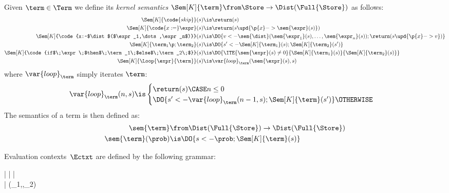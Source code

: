 \begin{definition}
\label{def:semantics}
  Given $\term \in \Term$ we define its \emph{kernel semantics}
  $\Sem[K]{\term} \from \Store \to \Dist(\Full{\Store}) $
  as follows:
  \begin{align*}
    \Sem[K]{\code{skip}}(s) &\is
      \return(s)
    \\
    \Sem[K]{\code{x:=}\expr}(s) &\is
        \return(s\upd{\p{x}->\sem{\expr}(s)})
    \\
    \Sem[K]{\code{x:~$\dist$($\expr_1,\dots,\expr_n$)}}(s) &\is
      \DO{
        v <- \sem{\dist}(\sem{\expr_1}(s),\dots,\sem{\expr_n}(s));
        \return(s\upd{\p{x}->v})
      }
    \\
    \Sem[K]{\term_1\p;\term_2}(s) &\is
      \DO{
        s' <- \Sem[K]{\term_1}(s);
        \Sem[K]{\term_2}(s')
      }
    \\
    \Sem[K]{\code{if$\;\expr\;$then$\;\term_1\;$else$\;\term_2\;$}}(s) &\is
      \DO{
        \ITE{\sem{\expr}(s) \ne 0}
          {\Sem[K]{\term_1}(s)}
          {\Sem[K]{\term_2}(s)}
      }
    \\
    \Sem[K]{\Loop{\expr}{\term}}(s) &\is
      \var{loop}_{\term}(\sem{\expr}(s), s)
\end{align*}
  where $\var{loop}_{\term}$ simply iterates $\term$:
  \[
    \var{loop}_{\term}(n, s) \is
      \begin{cases}
        \return(s) \CASE n \leq 0 \\
        \DO{s' <- \var{loop}_{\term}(n-1, s); \Sem[K]{\term}(s')} \OTHERWISE
      \end{cases}
  \]
The semantics of a term is then defined as:
  \begin{align*}
    \sem{\term} &\from \Dist(\Full{\Store}) \to \Dist(\Full{\Store})
    \\
    \sem{\term}(\prob) &\is \DO{s <- \prob; \Sem[K]{\term}(s)}
  \end{align*}
\end{definition}

Evaluation contexts~$\Ectxt$ are defined by the following grammar:
\begin{grammar}
  \Ectxt \is
    | 
| 
    | \Loop{\pr{\Ectxt}}{\term}
  \\
  \pr{\Ectxt} \is
      [\hole]
    | \prim(\vec{\expr}_1,\pr{\Ectxt},\vec{\expr}_2)
\end{grammar}

